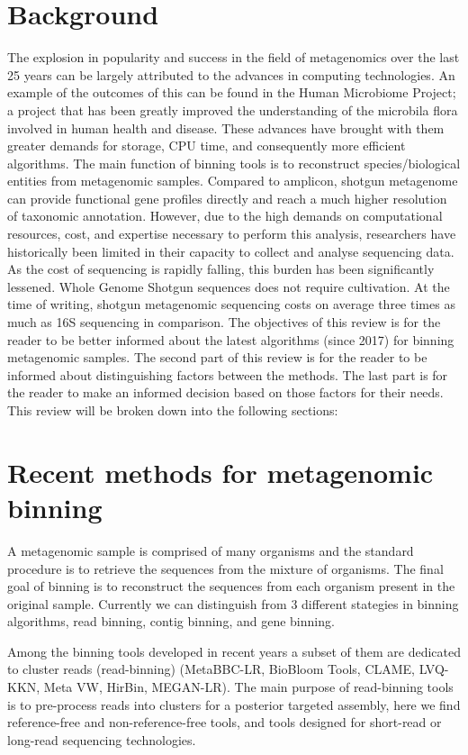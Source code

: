 \documentclass{article}
\begin{document}
\section*{Background}
The explosion in popularity and success in the field of metagenomics over the last 25 years can be largely attributed to the advances in computing technologies.
An example of the outcomes of this can be found in the Human Microbiome Project; a project that has been greatly improved the understanding of the microbila flora involved in human health and disease.
These advances have brought with them greater demands for storage, CPU time, and consequently more efficient algorithms.
The main function of binning tools is to reconstruct species/biological entities from metagenomic samples.  
Compared to amplicon, shotgun metagenome can provide functional gene profiles directly and reach a much higher resolution of taxonomic annotation.
However, due to the high demands on computational resources, cost, and expertise necessary to perform this analysis, researchers have historically been limited in their capacity to collect and analyse sequencing data.
As the cost of sequencing is rapidly falling, this burden has been significantly lessened.
Whole Genome Shotgun sequences does not require cultivation.
At the time of writing, shotgun metagenomic sequencing costs on average three times as much as 16S sequencing in comparison.
The objectives of this review is for the reader to be better informed about the latest algorithms (since 2017) for binning metagenomic samples.
The second part of this review is for the reader to be informed about distinguishing factors between the methods.
The last part is for the reader to make an informed decision based on those factors for their needs.
This review will be broken down into the following sections:

\section*{Recent methods for metagenomic binning}
A metagenomic sample is comprised of many organisms and the standard procedure is to retrieve the sequences from the mixture of organisms.
The final goal of binning is to reconstruct the sequences from each organism present in the original sample.
Currently we can distinguish from 3 different stategies in binning algorithms, read binning, contig binning, and gene binning.

Among the binning tools developed in recent years a subset of them are dedicated to cluster reads (read-binning) (MetaBBC-LR, BioBloom Tools, CLAME, LVQ-KKN, Meta VW, HirBin, MEGAN-LR).
The main purpose of read-binning tools is to pre-process reads into clusters for a posterior targeted assembly, here we find reference-free and non-reference-free tools, and tools designed for short-read or long-read sequencing technologies.
\end{document}
